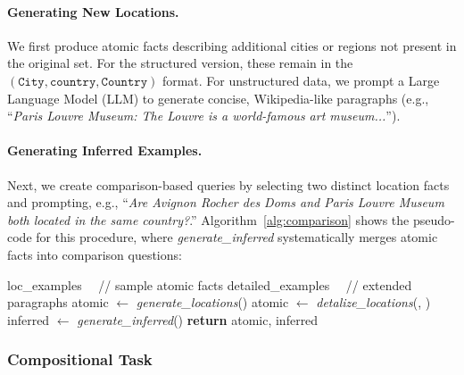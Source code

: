             \paragraph{Generating New Locations.}
                We first produce atomic facts describing additional cities or regions not present in the original set. 
                For the structured version, these remain in the $(\texttt{City}, \texttt{country}, \texttt{Country})$ format. 
                For unstructured data, we prompt a Large Language Model (LLM) to generate concise, Wikipedia-like paragraphs (e.g., “\emph{Paris Louvre Museum: The Louvre is a world-famous art museum...}”).
            
            \paragraph{Generating Inferred Examples.}
                Next, we create comparison-based queries by selecting two distinct location facts and prompting, e.g., “\emph{Are Avignon Rocher des Doms and Paris Louvre Museum both located in the same country?}.” 
                Algorithm~\ref{alg:comparison} shows the pseudo-code for this procedure, where \textit{generate\_inferred} systematically merges atomic facts into comparison questions:
                
                \begin{algorithm}[tb]
                \small
                \caption{Augmentation algorithm for comparison}
                \label{alg:comparison}    
                    \begin{algorithmic}[1]
                        \REQUIRE loc\_examples ~~// sample atomic facts
                        \REQUIRE detailed\_examples ~~// extended paragraphs
                        \STATE atomic $\gets$ \textit{generate\_locations}()
                            \STATE atomic $\gets$ \textit{detalize\_locations}(, )
                        \ENDIF
                        \STATE inferred $\gets$ \textit{generate\_inferred}()
                        \STATE \textbf{return} atomic, inferred
                    \end{algorithmic}
                \end{algorithm}
                
        \subsubsection{Compositional Task}
            \label{sec:method_compositional}
        
